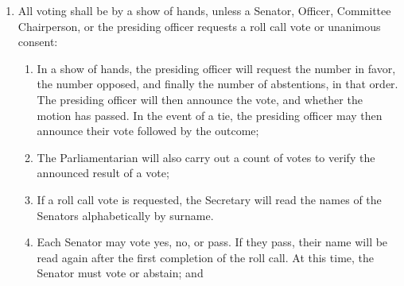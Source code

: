 \begin{enumerate}
\begin{enumerate}
\begin{enumerate}
    \item If an individual without queue rights wishes to speak during a restricted queue, they will not be called upon until no members with queue rights remain on the queue.
    \end{enumerate}
  \item A Senator may move to close the queue, requiring a second and a 2/3 vote.
    \begin{enumerate}
    \item No additional individuals may be added to a closed queue.
    \end{enumerate}
  \item A Senator may move to reopen a closed or restricted queue, requiring a second and a majority vote.
    \begin{enumerate}
    \item When speaking time is limited, speakers can yield their time in the following ways:
      \begin{enumerate}
      \item Yield to the Chair, forfeiting their time, or
      \item Yield to another speaker, transferring their time to another person in the room. That person may decline to speak, forfeiting their time.
      \end{enumerate}
    \end{enumerate}
  \item A yielded speaker may not yield time further.
  \end{enumerate}
\item All voting shall be by a show of hands, unless a Senator, Officer, Committee Chairperson, or the presiding officer requests a roll call vote or unanimous consent:
  \begin{enumerate}
  \item In a show of hands, the presiding officer will request the number in favor, the number opposed, and finally the number of abstentions, in that order. The presiding officer will then announce the vote, and whether the motion has passed. In the event of a tie, the presiding officer may then announce their vote followed by the outcome;
  \item The Parliamentarian will also carry out a count of votes to verify the announced result of a vote;
  \item If a roll call vote is requested, the Secretary will read the names of the Senators alphabetically by surname.
  \item Each Senator may vote yes, no, or pass. If they pass, their name will be read again after the first completion of the roll call. At this time, the Senator must vote or abstain; and

\end{enumerate}
\end{enumerate}
